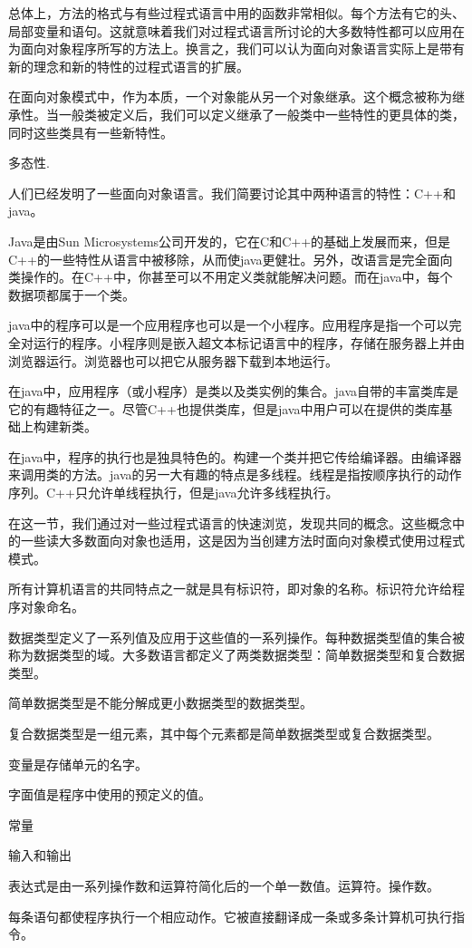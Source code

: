 总体上，方法的格式与有些过程式语言中用的函数非常相似。每个方法有它的头、局部变量和语句。这就意味着我们对过程式语言所讨论的大多数特性都可以应用在为面向对象程序所写的方法上。换言之，我们可以认为面向对象语言实际上是带有新的理念和新的特性的过程式语言的扩展。

在面向对象模式中，作为本质，一个对象能从另一个对象继承。这个概念被称为继承性。当一般类被定义后，我们可以定义继承了一般类中一些特性的更具体的类，同时这些类具有一些新特性。

多态性.

人们已经发明了一些面向对象语言。我们简要讨论其中两种语言的特性：C++和java。

Java是由Sun Microsystems公司开发的，它在C和C++的基础上发展而来，但是C++的一些特性从语言中被移除，从而使java更健壮。另外，改语言是完全面向类操作的。在C++中，你甚至可以不用定义类就能解决问题。而在java中，每个数据项都属于一个类。

java中的程序可以是一个应用程序也可以是一个小程序。应用程序是指一个可以完全对运行的程序。小程序则是嵌入超文本标记语言中的程序，存储在服务器上并由浏览器运行。浏览器也可以把它从服务器下载到本地运行。

在java中，应用程序（或小程序）是类以及类实例的集合。java自带的丰富类库是它的有趣特征之一。尽管C++也提供类库，但是java中用户可以在提供的类库基础上构建新类。

在java中，程序的执行也是独具特色的。构建一个类并把它传给编译器。由编译器来调用类的方法。java的另一大有趣的特点是多线程。线程是指按顺序执行的动作序列。C++只允许单线程执行，但是java允许多线程执行。

在这一节，我们通过对一些过程式语言的快速浏览，发现共同的概念。这些概念中的一些读大多数面向对象也适用，这是因为当创建方法时面向对象模式使用过程式模式。

所有计算机语言的共同特点之一就是具有标识符，即对象的名称。标识符允许给程序对象命名。

数据类型定义了一系列值及应用于这些值的一系列操作。每种数据类型值的集合被称为数据类型的域。大多数语言都定义了两类数据类型：简单数据类型和复合数据类型。

简单数据类型是不能分解成更小数据类型的数据类型。

复合数据类型是一组元素，其中每个元素都是简单数据类型或复合数据类型。

变量是存储单元的名字。

字面值是程序中使用的预定义的值。

常量

输入和输出

表达式是由一系列操作数和运算符简化后的一个单一数值。运算符。操作数。

每条语句都使程序执行一个相应动作。它被直接翻译成一条或多条计算机可执行指令。
